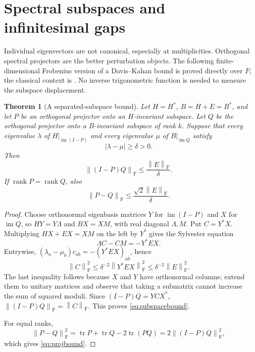 \documentclass[11pt,a4paper]{article}
\numberwithin{equation}{section}
\newtheorem{theorem}{Theorem}[section]
\theoremstyle{definition}
\theoremstyle{remark}
\newcommand{\rank}{\operatorname{rank}}
\newcommand{\tr}{\operatorname{tr}}
\newcommand{\im}{\operatorname{im}}
\newcommand{\Fr}{\mathrm F}
\newcommand{\norm}[1]{\left\lVert#1\right\rVert}
\begin{document}
\section{Spectral subspaces and infinitesimal gaps}\label{sec:subspaces}

Individual eigenvectors are not canonical, especially at multiplicities.
Orthogonal spectral projectors are the better perturbation objects. The
following finite-dimensional Frobenius version of a Davis--Kahan bound is
proved directly over $F$; the classical context is
\cite{DK,YWS}. No inverse trigonometric function is needed to measure the
subspace displacement.

\begin{theorem}[A separated-subspace bound]\label{thm:subspace}
Let $H=H^*$, $B=H+E=B^*$, and let $P$ be an orthogonal projector onto an
$H$-invariant subspace. Let $Q$ be the orthogonal projector onto a $B$-invariant subspace of
rank $k$. Suppose that every eigenvalue $\lambda$ of
$H|_{\im(I-P)}$ and every eigenvalue $\mu$ of $B|_{\im Q}$ satisfy
\[
 |\lambda-\mu|\ge\delta>0.
\]
Then
\begin{equation}\label{eq:subspacebound}
 \norm{(I-P)Q}_{\Fr}\le\frac{\norm E_{\Fr}}{\delta}.
\end{equation}
If $\rank P=\rank Q$, also
\begin{equation}\label{eq:projbound}
 \norm{P-Q}_{\Fr}\le\frac{\sqrt2\norm E_{\Fr}}{\delta}.
\end{equation}
\end{theorem}
\begin{proof}
Choose orthonormal eigenbasis matrices $Y$ for $\im(I-P)$ and $X$ for
$\im Q$, so $HY=Y\Lambda$ and $BX=XM$, with real diagonal
$\Lambda,M$. Put $C=Y^*X$. Multiplying $HX+EX=XM$ on the left by $Y^*$
gives the Sylvester equation
\[
 \Lambda C-CM=-Y^*EX.
\]
Entrywise,
$(\lambda_a-\mu_b)c_{ab}=-(Y^*EX)_{ab}$, hence
\[
 \norm C_{\Fr}^2\le\delta^{-2}\norm{Y^*EX}_{\Fr}^2
                         \le\delta^{-2}\norm E_{\Fr}^2.
\]
The last inequality follows because $X$ and $Y$ have orthonormal columns;
extend them to unitary matrices and observe that taking a submatrix cannot
increase the sum of squared moduli. Since $(I-P)Q=YCX^*$,
$\norm{(I-P)Q}_{\Fr}=\norm C_{\Fr}$. This proves
\eqref{eq:subspacebound}.

For equal ranks,
\[
 \norm{P-Q}_{\Fr}^2
 =\tr P+\tr Q-2\tr(PQ)
 =2\norm{(I-P)Q}_{\Fr}^2,
\]
which gives \eqref{eq:projbound}.
\end{proof}
\end{document}
